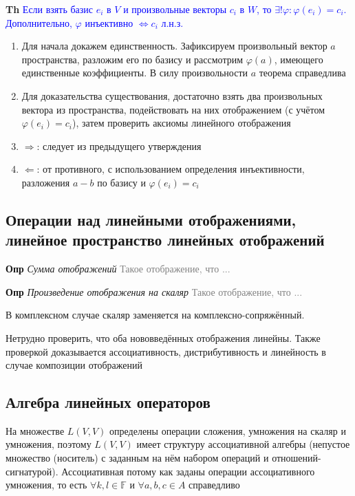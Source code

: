 \textbf{Th} \textcolor{blue}{Если взять базис $e_i$ в $V$ и произвольные векторы $c_i$ в $W$, то
    $\exists ! \varphi: \varphi(e_i) = c_i$. Дополнительно, $\varphi$ инъективно $\Leftrightarrow c_i$ л.н.з.}

\begin{enumerate}
    \item Для начала докажем единственность.
    Зафиксируем произвольный вектор $a$ пространства, разложим его по базису и рассмотрим $\varphi (a)$, имеющего
    единственные коэффициенты.
    В силу произвольности $a$ теорема справедлива
    \item Для доказательства существования, достаточно взять два произвольных вектора из пространства,
    подействовать на них отображением (с учётом $\varphi(e_i) = c_i$), затем проверить аксиомы линейного отображения
    \item $\Rightarrow$: следует из предыдущего утверждения
    \item $\Leftarrow$: от противного, с использованием определения инъективности, разложения $a - b$ по базису и
    $\varphi(e_i) = c_i$
\end{enumerate}

\subsection{Операции над линейными отображениями, линейное пространство линейных отображений}

\textbf{Опр} \textit{Сумма отображений} \textcolor{gray}{Такое отображение, что ...}

\textbf{Опр} \textit{Произведение отображения на скаляр} \textcolor{gray}{Такое отображение, что ...}

В комплексном случае скаляр заменяется на комплексно-сопряжённый.

Нетрудно проверить, что оба нововведённых отображения линейны.
Также проверкой доказывается ассоциативность, дистрибутивность и линейность в случае композиции отображений

\subsection{Алгебра линейных операторов}

На множестве $L(V, V)$ определены операции сложения, умножения на скаляр и умножения, поэтому $L(V, V)$ имеет
структуру ассоциативной алгебры (непустое множество (носитель) с заданным на нём набором операций и
отношений-сигнатурой).
Ассоциативная потому как заданы операции ассоциативного умножения, то есть $\forall k, l \in \mathbb{F}$ и
$\forall a, b, c \in A$ справедливо

